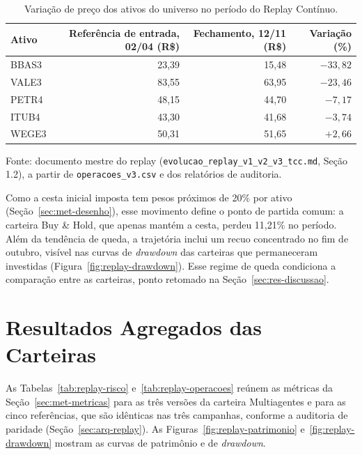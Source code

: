 \documentclass{eic-bcc-tcc}
\begin{document}
\begin{table}[htbp]
\centering
\caption{Variação de preço dos ativos do universo no período do Replay Contínuo.}
\label{tab:res-mercado}
\small
\begin{tabular}{lrrr}
\toprule
\textbf{Ativo} & \textbf{Referência de entrada, 02/04 (R\$)} & \textbf{Fechamento, 12/11 (R\$)} & \textbf{Variação (\%)} \\
\midrule
BBAS3 & 23{,}39 & 15{,}48 & $-33{,}82$ \\
VALE3 & 83{,}55 & 63{,}95 & $-23{,}46$ \\
PETR4 & 48{,}15 & 44{,}70 & $-7{,}17$ \\
ITUB4 & 43{,}30 & 41{,}68 & $-3{,}74$ \\
WEGE3 & 50{,}31 & 51{,}65 & $+2{,}66$ \\
\bottomrule
\end{tabular}
\par\smallskip\footnotesize Fonte: documento mestre do replay (\texttt{evolucao\_replay\_v1\_v2\_v3\_tcc.md}, Seção 1.2), a partir de \texttt{operacoes\_v3.csv} e dos relatórios de auditoria.
\end{table}

Como a cesta inicial imposta tem pesos próximos de 20\% por ativo (Seção~\ref{sec:met-desenho}), esse movimento define o ponto de partida comum: a carteira Buy \& Hold, que apenas mantém a cesta, perdeu 11,21\% no período. Além da tendência de queda, a trajetória inclui um recuo concentrado no fim de outubro, visível nas curvas de \textit{drawdown} das carteiras que permaneceram investidas (Figura~\ref{fig:replay-drawdown}). Esse regime de queda condiciona a comparação entre as carteiras, ponto retomado na Seção~\ref{sec:res-discussao}.

\section{Resultados Agregados das Carteiras}
\label{sec:res-agregados}

As Tabelas~\ref{tab:replay-risco} e~\ref{tab:replay-operacoes} reúnem as métricas da Seção~\ref{sec:met-metricas} para as três versões da carteira Multiagentes e para as cinco referências, que são idênticas nas três campanhas, conforme a auditoria de paridade (Seção~\ref{sec:arq-replay}). As Figuras~\ref{fig:replay-patrimonio} e~\ref{fig:replay-drawdown} mostram as curvas de patrimônio e de \textit{drawdown}.
\end{document}
